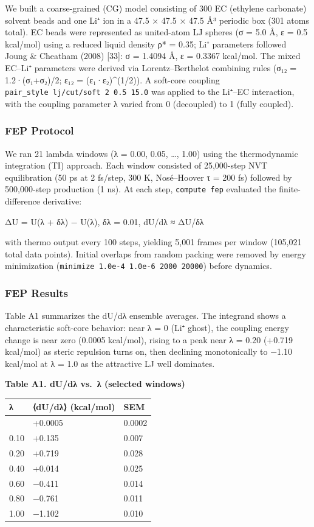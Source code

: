 \documentclass[
  11pt,
]{article}
\newcounter{none} %
\begin{document}
We built a coarse-grained (CG) model consisting of 300 EC (ethylene
carbonate) solvent beads and one Li⁺ ion in a 47.5 × 47.5 × 47.5 Å³
periodic box (301 atoms total). EC beads were represented as united-atom
LJ spheres (σ = 5.0 Å, ε = 0.5 kcal/mol) using a reduced liquid density
ρ* = 0.35; Li⁺ parameters followed Joung \& Cheatham (2008) {[}33{]}: σ
= 1.4094 Å, ε = 0.3367 kcal/mol. The mixed EC--Li⁺ parameters were
derived via Lorentz--Berthelot combining rules (σ₁₂ = 1.2·(σ₁+σ₂)/2; ε₁₂
= (ε₁·ε₂)\^{}(1/2)). A soft-core coupling
\texttt{pair\_style\ lj/cut/soft\ 2\ 0.5\ 15.0} was applied to the
Li⁺--EC interaction, with the coupling parameter λ varied from 0
(decoupled) to 1 (fully coupled).

\subsubsection{FEP Protocol}\label{fep-protocol}

We ran 21 lambda windows (λ = 0.00, 0.05, \ldots, 1.00) using the
thermodynamic integration (TI) approach. Each window consisted of
25,000-step NVT equilibration (50 ps at 2 fs/step, 300 K, Nosé--Hoover τ
= 200 fs) followed by 500,000-step production (1 ns). At each step,
\texttt{compute\ fep} evaluated the finite-difference derivative:

ΔU = U(λ + δλ) − U(λ), δλ = 0.01, dU/dλ ≈ ΔU/δλ

with thermo output every 100 steps, yielding 5,001 frames per window
(105,021 total data points). Initial overlaps from random packing were
removed by energy minimization
(\texttt{minimize\ 1.0e-4\ 1.0e-6\ 2000\ 20000}) before dynamics.

\subsubsection{FEP Results}\label{fep-results}

Table A1 summarizes the dU/dλ ensemble averages. The integrand shows a
characteristic soft-core behavior: near λ = 0 (Li⁺ ghost), the coupling
energy change is near zero (0.0005 kcal/mol), rising to a peak near λ =
0.20 (+0.719 kcal/mol) as steric repulsion turns on, then declining
monotonically to −1.10 kcal/mol at λ = 1.0 as the attractive LJ well
dominates.

\textbf{Table A1. dU/dλ vs.~λ (selected windows)}

{\def\LTcaptype{none} %
\begin{longtable}[]{@{}lll@{}}
\toprule\noalign{}
λ & ⟨dU/dλ⟩ (kcal/mol) & SEM \\
\midrule\noalign{}
\endhead
\bottomrule\noalign{}
\endlastfoot
0.00 & +0.0005 & 0.0002 \\
0.10 & +0.135 & 0.007 \\
0.20 & +0.719 & 0.028 \\
0.40 & +0.014 & 0.025 \\
0.60 & −0.411 & 0.014 \\
0.80 & −0.761 & 0.011 \\
1.00 & −1.102 & 0.010 \\
\end{longtable}
}
\end{document}
